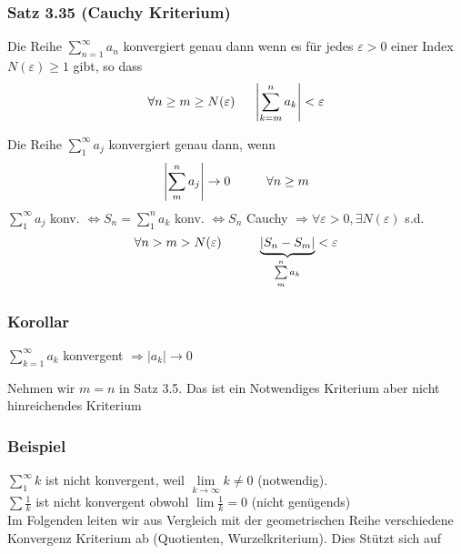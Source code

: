 \subsubsection*{Satz 3.35 (Cauchy Kriterium)}
Die Reihe $\sum\limits_{n = 1}^\infty  {{a_n}} $ konvergiert genau dann wenn es für jedes $\varepsilon>0$ einer Index $N(\varepsilon)\geq 1$ gibt, so dass 
\[ \forall n\geq m\geq N(\varepsilon)\hspace{5mm}\left| \sum\limits_{k=m}^n a_k\right|<\varepsilon\]

\begin{beweis}{}
Die Reihe $\sum\limits_1^\infty  {{a_j}} $ konvergiert genau dann, wenn 
\[\left| {\sum\limits_m^n {{a_j}} } \right| \to 0\hspace{10mm}\forall n \ge m\]
$\sum\limits_1^\infty  {{a_j}} $ konv. $\Leftrightarrow S_n=\sum\limits_1^n a_k$ konv. $\Leftrightarrow S_n$ Cauchy $\Rightarrow \forall\varepsilon>0, \exists N(\varepsilon)$ s.d. 
\[\forall n > m > N(\varepsilon)\hspace{10mm}\underbrace {\left| {{S_n} - {S_m}} \right|}_{\sum\limits_m^n {{a_k}} } < \varepsilon \]
\end{beweis}
\subsubsection*{Korollar}
$\sum\limits_{k = 1}^\infty  {{a_k}} $ konvergent $\Rightarrow\left| a_k\right|\to 0$

\begin{beweis}{}
Nehmen wir $m=n$ in Satz 3.5. Das ist ein Notwendiges Kriterium aber nicht hinreichendes Kriterium 
\end{beweis} 

\subsubsection*{Beispiel}
$\sum\limits_1^\infty  k $ ist nicht konvergent, weil $\mathop {\lim }\limits_{k \to \infty } k\not  = 0$ (notwendig).\\
$\sum\frac{1}{k}$ ist nicht konvergent obwohl $\lim\frac{1}{k}=0$ (nicht genügends)\\

Im Folgenden leiten wir aus Vergleich mit der geometrischen Reihe verschiedene Konvergenz Kriterium ab (Quotienten, Wurzelkriterium). Dies Stützt sich auf

